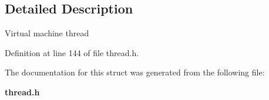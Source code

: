 \subsection{Detailed Description}
Virtual machine thread 

Definition at line 144 of file thread.h.



The documentation for this struct was generated from the following file:\begin{DoxyCompactItemize}
\item 
{\bf thread.h}\end{DoxyCompactItemize}
